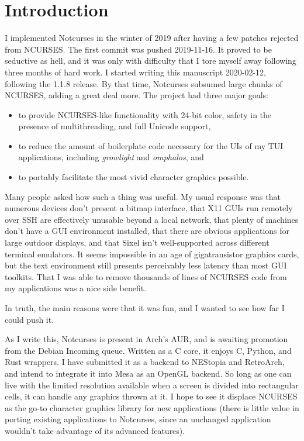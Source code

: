 \documentclass[letterpaper,10pt]{article}
\newenvironment{denseitemize}{
  \begin{itemize}
      \setlength{\itemsep}{0pt}
}{
  \end{itemize}
}
\newcommand\CC{C\nolinebreak\hspace{-.05em}\raisebox{.4ex}{\relsize{-3}{\textbf{+}}}\nolinebreak\hspace{-.10em}\raisebox{.4ex}{\relsize{-3}{\textbf{+}}}\hspace{.2em}}
\begin{document}
\section{Introduction}

I implemented Notcurses in the winter of 2019 after having a few patches
rejected from NCURSES. The first commit was pushed 2019-11-16. It proved to
be seductive as hell, and it was only with difficulty that I tore myself away
following three months of hard work. I started writing this manuscript
2020-02-12, following the 1.1.8 release. By that time, Notcurses subsumed large
chunks of NCURSES, adding a great deal more. The project had three major goals:

\begin{denseitemize}
\item to provide NCURSES-like functionality with 24-bit color, safety in the
    presence of multithreading, and full Unicode support,
\item to reduce the amount of boilerplate code necessary for the UIs of my
    TUI applications, including \textit{growlight} and \textit{omphalos}, and
\item to portably facilitate the most vivid character graphics possible.
\end{denseitemize}

Many people asked how such a thing was useful. My usual response was that
numerous devices don't present a bitmap interface, that X11 GUIs run remotely
over SSH are effectively unusable beyond a local network, that plenty of
machines don't have a GUI environment installed, that there are obvious
applications for large outdoor displays, and that Sixel isn't well-supported
across different terminal emulators. It seems impossible in an age of
gigatransistor graphics cards, but the text environment still presents
perceivably less latency than most GUI toolkits. That I was able to remove
thousands of lines of NCURSES code from my applications was a nice side
benefit.

In truth, the main reasons were that it was fun, and I wanted to see how far
I could push it.

As I write this, Notcurses is present in Arch's AUR, and is awaiting promotion
from the Debian Incoming queue. Written as a C core, it enjoys \CC, Python, and
Rust wrappers. I have submitted it as a backend to NEStopia and RetroArch, and
intend to integrate it into Mesa as an OpenGL backend. So long as one can live
with the limited resolution available when a screen is divided into rectangular
cells, it can handle any graphics thrown at it. I hope to see it displace
NCURSES as the go-to character graphics library for new applications (there is
little value in porting existing applications to Notcurses, since an unchanged
application wouldn't take advantage of its advanced features).
\end{document}
